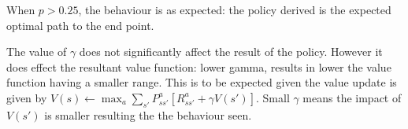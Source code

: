 When $p > 0.25$, the behaviour is as expected: the policy derived
is the expected optimal path to the end point.

The value of $\gamma$ does not significantly affect the 
result of the policy.
However it does effect the resultant value function:
lower gamma, results in lower the value function having a smaller 
range. This is to be expected given the value update is given by 
$V(s) \leftarrow \max_a \sum_{s'} P^a_{ss'}[R^a_{ss'} + \gamma V(s')]$.
Small $\gamma$ means the impact of $V(s')$ is smaller resulting the 
the behaviour seen.